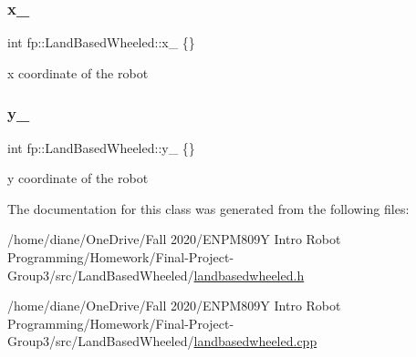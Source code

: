 \subsubsection{\texorpdfstring{x\+\_\+}{x\_}}
{\footnotesize\ttfamily int fp\+::\+Land\+Based\+Wheeled\+::x\+\_\+ \{\}\hspace{0.3cm}{\ttfamily [protected]}}

x coordinate of the robot \mbox{\label{classfp_1_1_land_based_wheeled_a5b66ada6988a2b8ce6efafa971dfd9c6}} 
\subsubsection{\texorpdfstring{y\+\_\+}{y\_}}
{\footnotesize\ttfamily int fp\+::\+Land\+Based\+Wheeled\+::y\+\_\+ \{\}\hspace{0.3cm}{\ttfamily [protected]}}

y coordinate of the robot 

The documentation for this class was generated from the following files\+:\begin{DoxyCompactItemize}
\item 
/home/diane/\+One\+Drive/\+Fall 2020/\+E\+N\+P\+M809\+Y Intro Robot Programming/\+Homework/\+Final-\/\+Project-\/\+Group3/src/\+Land\+Based\+Wheeled/\hyperlink{landbasedwheeled_8h}{landbasedwheeled.\+h}\item 
/home/diane/\+One\+Drive/\+Fall 2020/\+E\+N\+P\+M809\+Y Intro Robot Programming/\+Homework/\+Final-\/\+Project-\/\+Group3/src/\+Land\+Based\+Wheeled/\hyperlink{landbasedwheeled_8cpp}{landbasedwheeled.\+cpp}\end{DoxyCompactItemize}
